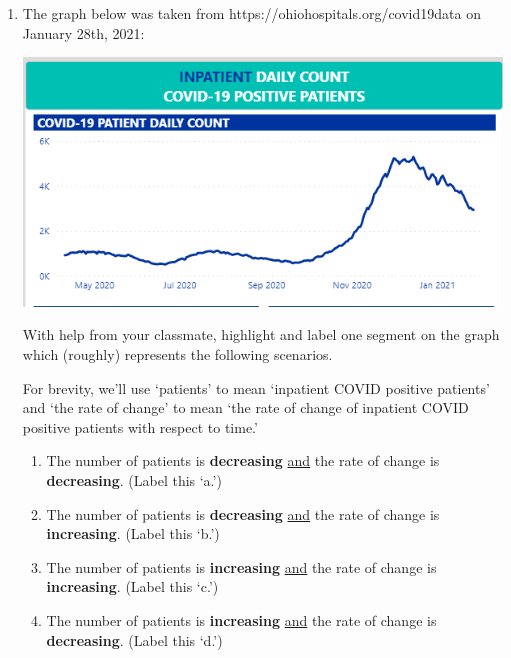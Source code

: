 \begin{enumerate}
\newpage

\item  The graph below was taken from https://ohiohospitals.org/covid19data on January 28th, 2021:

\bigskip

\centerline{\includegraphics[width = 5in]{./AppDerivativesGraphics/COVIDPatients.PNG}}

\bigskip


With help from your classmate, highlight and label one segment on the graph which (roughly) represents the following scenarios.

\smallskip

For brevity, we'll use `patients' to mean `inpatient COVID positive patients' and `the rate of change' to mean `the rate of change of inpatient COVID positive patients with respect to time.'

\smallskip

\begin{enumerate}

\item  The number of patients is \textbf{decreasing}  \underline{and}  the rate of change is \textbf{decreasing}.  (Label this `a.')

\smallskip

\item  The number of patients is \textbf{decreasing}  \underline{and}  the rate of change  is \textbf{increasing}.  (Label this `b.')

\smallskip


\item  The number of patients is \textbf{increasing}  \underline{and}  the rate of change  is \textbf{increasing}.  (Label this `c.')

\smallskip


\item  The number of patients is \textbf{increasing}  \underline{and}  the rate of change is \textbf{decreasing}.  (Label this `d.')


\end{enumerate}
\end{enumerate}
